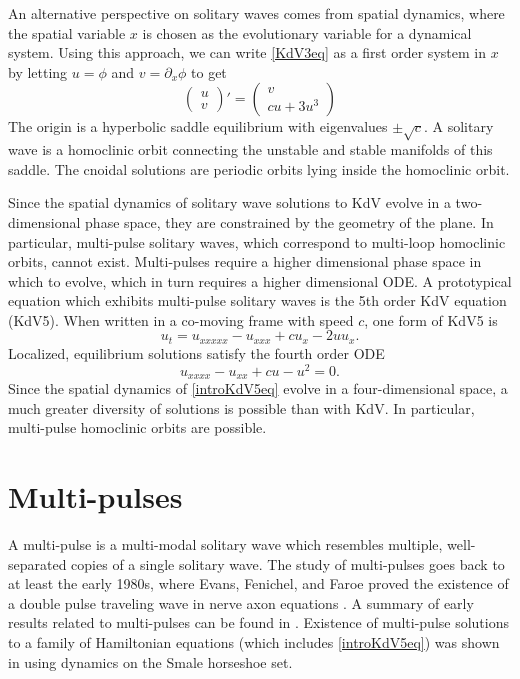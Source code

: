 \documentclass[thesis2.tex]{subfiles}
\begin{document}
An alternative perspective on solitary waves comes from spatial dynamics, where the spatial variable $x$ is chosen as the evolutionary variable for a dynamical system. Using this approach, we can write \cref{KdV3eq} as a first order system in $x$ by letting $u = \phi$ and $v = \partial_x \phi$ to get
\begin{equation}\label{KdV3sd}
\begin{pmatrix}u \\ v
\end{pmatrix}'
= \begin{pmatrix}
v \\ c u + 3 u^3
\end{pmatrix}
\end{equation}
The origin is a hyperbolic saddle equilibrium with eigenvalues $\pm \sqrt{c}$. A solitary wave is a homoclinic orbit connecting the unstable and stable manifolds of this saddle. The cnoidal solutions are periodic orbits lying inside the homoclinic orbit.

Since the spatial dynamics of solitary wave solutions to KdV evolve in a two-dimensional phase space, they are constrained by the geometry of the plane. In particular, multi-pulse solitary waves, which correspond to multi-loop homoclinic orbits, cannot exist. Multi-pulses require a higher dimensional phase space in which to evolve, which in turn requires a higher dimensional ODE. A prototypical equation which exhibits multi-pulse solitary waves is the 5th order KdV equation (KdV5). When written in a co-moving frame with speed $c$, one form of KdV5 is
\begin{equation}\label{introKdV5}
u_t = u_{xxxxx} - u_{xxx} + c u_x - 2 u u_x .
\end{equation}
Localized, equilibrium solutions satisfy the fourth order ODE
\begin{equation}\label{introKdV5eq}
u_{xxxx} - u_{xx} + c u - u^2 = 0.
\end{equation}
Since the spatial dynamics of \cref{introKdV5eq} evolve in a four-dimensional space, a much greater diversity of solutions is possible than with KdV. In particular, multi-pulse homoclinic orbits are possible.

\section{Multi-pulses}

A multi-pulse is a multi-modal solitary wave which resembles multiple, well-separated copies of a single solitary wave. The study of multi-pulses goes back to at least the early 1980s, where Evans, Fenichel, and Faroe proved the existence of a double pulse traveling wave in nerve axon equations \cite{Evans1982}. A summary of early results related to multi-pulses can be found in \cite[Section 1]{Sandstede1998}. Existence of multi-pulse solutions to a family of Hamiltonian equations (which includes \cref{introKdV5eq}) was shown in \cite{Buffoni1996} using dynamics on the Smale horseshoe set. 
\end{document}
